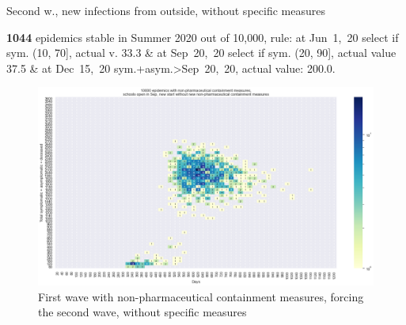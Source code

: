 \documentclass[8pt]{beamer}
\begin{document}
\begin{frame}{Second w., new infections from outside, without specific measures}


\textbf{1044} {\tiny epidemics stable in Summer 2020 out of 10,000, rule: at Jun~1,~20 select if sym. (10, 70], actual v. 33.3 \& at Sep~20,~20 select if sym. (20, 90], actual value 37.5 \& at Dec~15,~20 sym.+asym.>Sep~20,~20, actual value: 200.0.}

\begin{figure}[H]
\center
\includegraphics[scale=0.17]{10kForceWave2.png}
\caption{First wave with non-pharmaceutical containment measures, forcing the second wave, without specific measures}
\label{selForceWave2}
\end{figure}



\end{frame}
\end{document}
